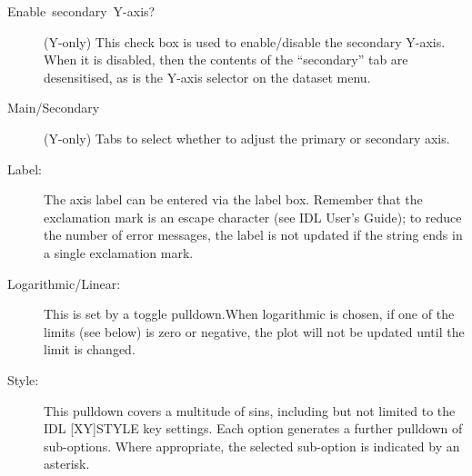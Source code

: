 \documentclass[11pt,twoside,english]{article}
\begin{document}
\begin{description}
\item[Enable~secondary~Y-axis?] (Y-only) This check box is used to
  enable/disable the secondary Y-axis. When it is disabled, then the
  contents of the ``secondary'' tab are desensitised, as is the Y-axis
  selector on the dataset menu.
\item[Main/Secondary] (Y-only) Tabs to select whether to adjust the
  primary or secondary axis.
\item [Label:]The axis label can be entered via the label box. Remember
  that the exclamation mark is an escape character (see IDL User's
  Guide); to reduce the number of error messages, the label is not
  updated if the string ends in a single exclamation mark.
\item [Logarithmic/Linear:]This is set by a toggle pulldown.When
  logarithmic is chosen, if one of the limits (see below) is zero or
  negative, the plot will not be updated until the limit is changed.
\item [Style:]This pulldown covers a multitude of sins, including but
  not limited to the IDL {[}XY{]}STYLE key settings. Each option
  generates a further pulldown of sub-options. Where appropriate, the
  selected sub-option is indicated by an asterisk.


\end{description}
\end{document}
